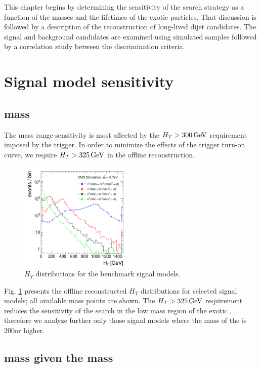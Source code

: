 This chapter begins by determining the sensitivity of the search strategy as a function
of the masses and the lifetimes
of the exotic particles. That discussion is followed by a description
of the reconstruction of long-lived dijet candidates.
The signal and background candidates are examined using simulated samples followed by 
a correlation study between the discrimination criteria.

\section{Signal model sensitivity}
\label{sec:sigsensitivity}

\subsection{\Higgs mass}

The \Higgs mass range sensitivity is most affected by the $H_T>300\,\text{Ge\hspace{-.08em}V}$ requirement imposed by the trigger. 
In order to minimize the effects of the trigger turn-on curve,
we require $H_T>325\,\text{Ge\hspace{-.08em}V}$ in the offline reconstruction.

\begin{figure}[htbp]
\centering
\includegraphics[width=0.49\textwidth]{plots/signal/ht.pdf}
\caption{$H_T$ distributions for the benchmark signal models.\label{fig:sight}}
\end{figure}

Fig. \ref{fig:sight} presents the offline reconstructed $H_T$ distributions 
for selected signal models; all available \Higgs 
mass points are shown.
The $H_T>325\,\text{Ge\hspace{-.08em}V}$ requirement reduces the sensitivity of the search in the low mass region of the exotic \Higgs,
therefore we analyze further only those signal models where the mass of the \Higgs is 200\GeV or higher.

\subsection{\X mass given the \Higgs mass}

